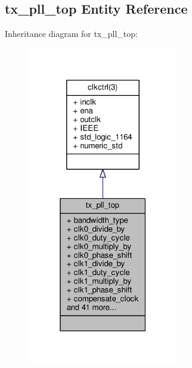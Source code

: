 \subsection{tx\+\_\+pll\+\_\+top Entity Reference}
\label{classtx__pll__top}


Inheritance diagram for tx\+\_\+pll\+\_\+top\+:\nopagebreak
\begin{figure}[H]
\begin{center}
\leavevmode
\includegraphics[width=187pt]{dd/dbc/classtx__pll__top__inherit__graph}
\end{center}
\end{figure}


